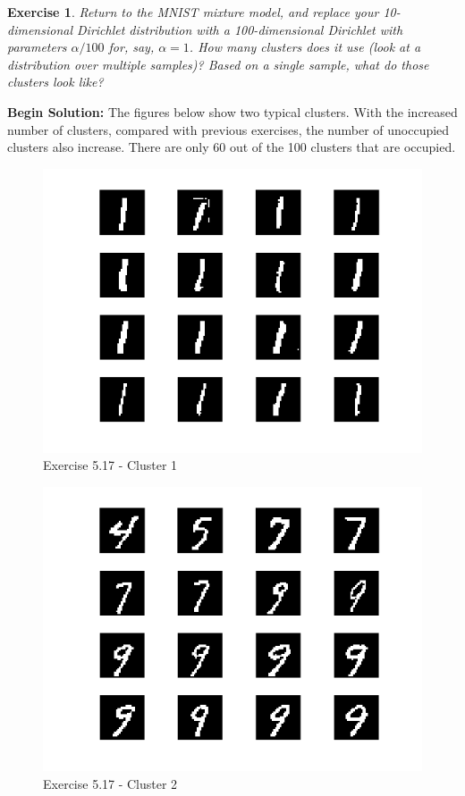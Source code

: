 \documentclass[twoside]{article}
\newcounter{lecnum}
\newtheorem{exercise}{Exercise}[lecnum]
\begin{document}
   \begin{exercise}
     Return to the MNIST mixture model, and replace your 10-dimensional Dirichlet distribution with a 100-dimensional Dirichlet with parameters $\alpha/100$ for, say, $\alpha=1$. How many clusters does it use (look at a distribution over multiple samples)? Based on a single sample, what do those clusters look like?
   \end{exercise}
\textbf{Begin Solution:}
The figures below show two typical clusters. With the increased number of clusters, compared with previous exercises, the number of unoccupied clusters also increase. There are only 60 out of the 100 clusters that are occupied.
\begin{figure}[H]
\begin{center}
\includegraphics[width=\textwidth]{./exercise_5_17/Cluster1.png}
\end{center}
\caption{Exercise 5.17 - Cluster 1}
\end{figure}  
\begin{figure}[H]
\begin{center}
\includegraphics[width=\textwidth]{./exercise_5_17/Cluster2.png}
\end{center}
\caption{Exercise 5.17 - Cluster 2}
\end{figure}
\end{document}

